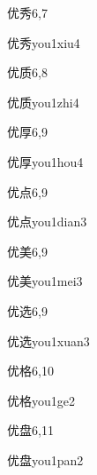 \begin{entry}{优秀}{6,7}
  \begin{phonetics}{优秀}{you1xiu4}
  \end{phonetics}
\end{entry}

\begin{entry}{优质}{6,8}
  \begin{phonetics}{优质}{you1zhi4}
  \end{phonetics}
\end{entry}

\begin{entry}{优厚}{6,9}
  \begin{phonetics}{优厚}{you1hou4}
  \end{phonetics}
\end{entry}

\begin{entry}{优点}{6,9}
  \begin{phonetics}{优点}{you1dian3}
  \end{phonetics}
\end{entry}

\begin{entry}{优美}{6,9}
  \begin{phonetics}{优美}{you1mei3}
  \end{phonetics}
\end{entry}

\begin{entry}{优选}{6,9}
  \begin{phonetics}{优选}{you1xuan3}
  \end{phonetics}
\end{entry}

\begin{entry}{优格}{6,10}
  \begin{phonetics}{优格}{you1ge2}
  \end{phonetics}
\end{entry}

\begin{entry}{优盘}{6,11}
  \begin{phonetics}{优盘}{you1pan2}
  \end{phonetics}
\end{entry}

